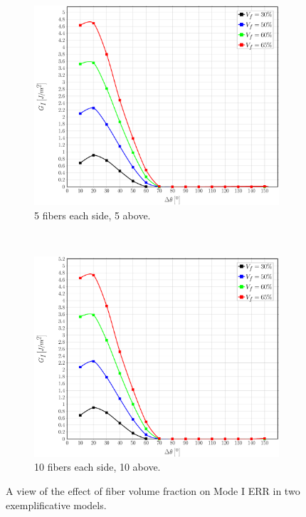\documentclass[review]{elsarticle}
\begin{document}
\begin{figure}[!h]
\centering
    \begin{subfigure}[b]{0.475\textwidth}
        \includegraphics[width=\textwidth]{vf-smallermodel-GI.pdf}
        \caption{5 fibers each side, 5 above.}\label{subfig:volfracsmallerMI}
    \end{subfigure} ~
    \begin{subfigure}[b]{0.475\textwidth}
        \includegraphics[width=\textwidth]{vf-biggermodel-GI.pdf}
        \caption{10 fibers each side, 10 above.}\label{subfig:volfracbiggerMI}
    \end{subfigure}

\caption{A view of the effect of fiber volume fraction on Mode I ERR in two exemplificative models.}\label{fig:volumefractionMI}
\end{figure}
\end{document}
